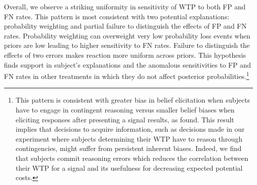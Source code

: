 \documentclass[12pt,a4paper]{article}
\begin{document}
\begin{table}[htbp]\centering 
\caption{Informed Protection Response} 
\label{tab:protectReg}
\end{table}



Overall, we observe a striking uniformity in sensitivity of WTP to both FP and FN rates. This pattern is most consistent with two potential explanations: probability weighting and partial failure to distinguish the effects of FP and FN rates. Probability weighting can overweight very low probability loss events when priors are low leading to higher sensitivity to FN rates. Failure to distinguish the effects of two errors makes reaction more uniform across priors. This hypothesis finds support in subject's explanations and the anomalous sensitivities to FP and FN rates in other treatments in which they do not affect posterior probabilities.\footnote{This pattern is consistent with greater bias in belief elicitation when subjects have to engage in contingent reasoning versus smaller belief biases when eliciting responses after presenting a signal results, as \citet{aina_contingent_2023} found. This result implies that decisions to acquire information, such as decisions made in our experiment where subjects determining their WTP have to reason through contingencies, might suffer from persistent inherent biases. Indeed, we find that subjects commit reasoning errors which reduces the correlation between their WTP for a signal and its usefulness for decreasing expected potential costs.}
\end{document}
